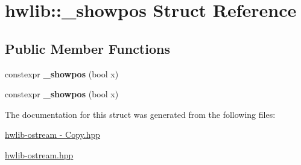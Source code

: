 \hypertarget{structhwlib_1_1__showpos}{}\section{hwlib\+:\+:\+\_\+showpos Struct Reference}
\label{structhwlib_1_1__showpos}
\subsection*{Public Member Functions}
\begin{DoxyCompactItemize}
\item 
constexpr {\bfseries \+\_\+showpos} (bool x)\hypertarget{structhwlib_1_1__showpos_acc9f9e1970e3b70823e9dac74dc942b0}{}\label{structhwlib_1_1__showpos_acc9f9e1970e3b70823e9dac74dc942b0}

\item 
constexpr {\bfseries \+\_\+showpos} (bool x)\hypertarget{structhwlib_1_1__showpos_acc9f9e1970e3b70823e9dac74dc942b0}{}\label{structhwlib_1_1__showpos_acc9f9e1970e3b70823e9dac74dc942b0}

\end{DoxyCompactItemize}


The documentation for this struct was generated from the following files\+:\begin{DoxyCompactItemize}
\item 
\hyperlink{hwlib-ostream_01-_01_copy_8hpp}{hwlib-\/ostream -\/ Copy.\+hpp}\item 
\hyperlink{hwlib-ostream_8hpp}{hwlib-\/ostream.\+hpp}\end{DoxyCompactItemize}
